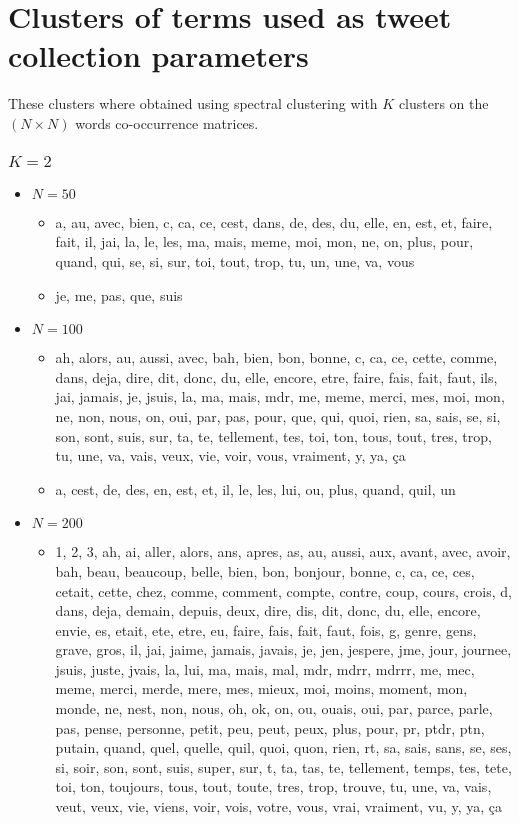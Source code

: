 \chapter{Clusters of terms used as tweet collection parameters}
\label{Appendix: Clusters}

These clusters where obtained using spectral clustering with $K$ clusters on the $(N \times N) $ words co-occurrence matrices.

\subsection*{$K=2$}

\begin{itemize}
\item $N = 50$
	\begin{itemize}
	\item a, au, avec, bien, c, ca, ce, cest, dans, de, des, du, elle, en, est, et, faire, fait, il, jai, la, le, les, ma, mais, meme, moi, mon, ne, on, plus, pour, quand, qui, se, si, sur, toi, tout, trop, tu, un, une, va, vous
	\item je, me, pas, que, suis
	\end{itemize}
\item $N = 100$
	\begin{itemize}
	\item ah, alors, au, aussi, avec, bah, bien, bon, bonne, c, ca, ce, cette, comme, dans, deja, dire, dit, donc, du, elle, encore, etre, faire, fais, fait, faut, ils, jai, jamais, je, jsuis, la, ma, mais, mdr, me, meme, merci, mes, moi, mon, ne, non, nous, on, oui, par, pas, pour, que, qui, quoi, rien, sa, sais, se, si, son, sont, suis, sur, ta, te, tellement, tes, toi, ton, tous, tout, tres, trop, tu, une, va, vais, veux, vie, voir, vous, vraiment, y, ya, ça
	\item a, cest, de, des, en, est, et, il, le, les, lui, ou, plus, quand, quil, un
	\end{itemize}
\item $N = 200$
 \begin{itemize}
 	\item 1, 2, 3, ah, ai, aller, alors, ans, apres, as, au, aussi, aux, avant, avec, avoir, bah, beau, beaucoup, belle, bien, bon, bonjour, bonne, c, ca, ce, ces, cetait, cette, chez, comme, comment, compte, contre, coup, cours, crois, d, dans, deja, demain, depuis, deux, dire, dis, dit, donc, du, elle, encore, envie, es, etait, ete, etre, eu, faire, fais, fait, faut, fois, g, genre, gens, grave, gros, il, jai, jaime, jamais, javais, je, jen, jespere, jme, jour, journee, jsuis, juste, jvais, la, lui, ma, mais, mal, mdr, mdrr, mdrrr, me, mec, meme, merci, merde, mere, mes, mieux, moi, moins, moment, mon, monde, ne, nest, non, nous, oh, ok, on, ou, ouais, oui, par, parce, parle, pas, pense, personne, petit, peu, peut, peux, plus, pour, pr, ptdr, ptn, putain, quand, quel, quelle, quil, quoi, quon, rien, rt, sa, sais, sans, se, ses, si, soir, son, sont, suis, super, sur, t, ta, tas, te, tellement, temps, tes, tete, toi, ton, toujours, tous, tout, toute, tres, trop, trouve, tu, une, va, vais, veut, veux, vie, viens, voir, vois, votre, vous, vrai, vraiment, vu, y, ya, ça

\end{itemize}
\end{itemize}
